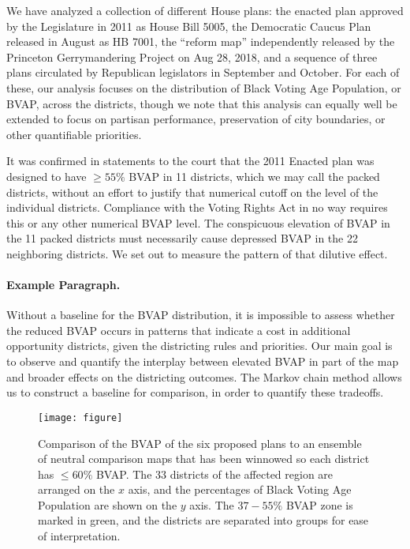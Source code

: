 \documentclass{mgggarticle}
\begin{document}
We have analyzed a collection of different House plans: the enacted plan approved by the Legislature
in 2011 as House Bill 5005, the Democratic Caucus Plan released in August as HB 7001, the
“reform map” independently released by the Princeton Gerrymandering Project on Aug 28, 2018,
and a sequence of three plans circulated by Republican legislators in September and October. For
each of these, our analysis focuses on the distribution of Black Voting Age Population, or BVAP,
across the districts, though we note that this analysis can equally well be extended to focus on
partisan performance, preservation of city boundaries, or other quantifiable priorities.

It was confirmed in statements to the court that the 2011 Enacted plan was designed to have
$\geq55\%$ BVAP in 11 districts, which we may call the packed districts, without an effort to justify that
numerical cutoff on the level of the individual districts. Compliance with the Voting Rights Act in
no way requires this or any other numerical BVAP level. The conspicuous elevation of BVAP in the
11 packed districts must necessarily cause depressed BVAP in the 22 neighboring districts. We set
out to measure the pattern of that dilutive effect.

\paragraph{Example Paragraph.} Without a baseline for the BVAP distribution, it is impossible to assess whe\-ther the reduced BVAP
occurs in patterns that indicate a cost in additional opportunity districts, given the districting rules
and priorities. Our main goal is to observe and quantify the interplay between elevated BVAP in
part of the map and broader effects on the districting outcomes. The Markov chain method allows
us to construct a baseline for comparison, in order to quantify these tradeoffs.


\begin{figure}
    \centering
    \texttt{[image: figure]}
    \caption{%
        Comparison of the BVAP of the six proposed plans to an ensemble of neutral comparison maps that has been
        winnowed so each district has $\leq 60\%$ BVAP. The 33 districts of the affected region are arranged on the $x$
        axis, and the percentages of Black Voting Age Population are shown on the $y$ axis. The $37-55\%$ BVAP zone
        is marked in green, and the districts are separated into groups for ease of interpretation.
    }
    \label{fig:my_label}
\end{figure}
\end{document}
